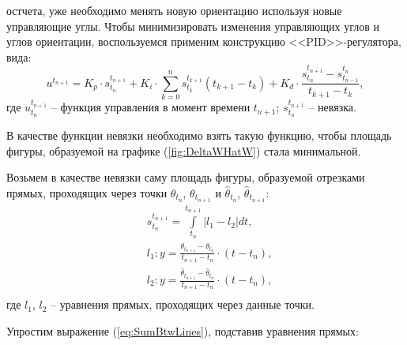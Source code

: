 остчета, уже необходимо менять новую ориентацию используя новые управляющие углы.
Чтобы минимизировать изменения управляющих углов и углов ориентации, воспользуемся
применим конструкцию <<PID>>-регулятора, вида:
\begin{equation}
  u^{t_{n+1}} =
      K_p \cdot s^{t_{n+1}}_{t_n}
    + K_i \cdot \sum\limits_{k=0}^{n} s^{t_{k+1}}_{t_k} (t_{k+1} - t_k)
    + K_d \cdot \frac{s^{t_{n+1}}_{t_n} - s^{t_{n}}_{t_{n-1}}}{t_{k+1} - t_k},
\end{equation}
где $u^{t_{n+1}}_{t_n}$ -- функция управления в момент времени $t_{n+1}$;
$s^{t_{n+1}}_{t_n}$ -- невязка.\par
  В качестве функции невязки необходимо взять такую функцию, чтобы площадь фигуры,
образуемой на графике (\ref{fig:DeltaWHatW}) стала минимальной.\par
  Возьмем в качестве невязки саму площадь фигуры, образуемой отрезками прямых,
проходящих через точки $\theta_{t_{n}}$, $\theta_{t_{n+1}}$ и $\hat{\theta}_{t_{n}}$,
$\hat{\theta}_{t_{n+1}}$:
\begin{equation}\label{eq:SumBtwLines}
  \begin{aligned}
    & s^{t_{n+1}}_{t_n} = \int\limits_{t_n}^{t_{n+1}} |l_1 - l_2| dt, \\
    & l_1: y = \frac{\theta_{t_{n+1}} - \theta_{t_{n}}}{t_{n+1} - t_{n}} \cdot (t - t_{n}),\\
    & l_2: y = \frac{\hat{\theta}_{t_{n+1}} - \hat{\theta}_{t_{n}}}{t_{n+1} - t_{n}} \cdot (t - t_{n}),\\
  \end{aligned}
\end{equation}
где $l_1$, $l_2$ -- уравнения прямых, проходящих через данные точки.\par
  Упростим выражение (\ref{eq:SumBtwLines}), подставив уравнения прямых:
